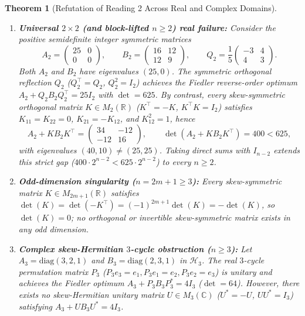 \documentclass[11pt,a4paper]{article}
\theoremstyle{plain}
\newtheorem{theorem}{Theorem}[section]
\theoremstyle{definition}
\newcommand{\C}{\mathbb{C}}
\newcommand{\R}{\mathbb{R}}
\newcommand{\diag}{\mathrm{diag}}
\newcommand{\Herm}{\mathcal{H}}
\begin{document}
\begin{theorem}[Refutation of Reading 2 Across Real and Complex Domains]\label{thm:refute2}
\leavevmode
\begin{enumerate}
  \item \textbf{Universal $2 \times 2$ (and block-lifted $n \ge 2$) real failure:} Consider the positive semidefinite integer symmetric matrices
  \[
    A_2 = \begin{pmatrix} 25 & 0 \\ 0 & 0 \end{pmatrix}, \qquad
    B_2 = \begin{pmatrix} 16 & 12 \\ 12 & 9 \end{pmatrix}, \qquad
    Q_2 = \frac{1}{5}\begin{pmatrix} -3 & 4 \\ 4 & 3 \end{pmatrix}.
  \]
  Both $A_2$ and $B_2$ have eigenvalues $(25, 0)$. The \emph{symmetric} orthogonal reflection $Q_2$ ($Q_2^\top = Q_2$, $Q_2^2 = I_2$) achieves the Fiedler reverse-order optimum $A_2 + Q_2 B_2 Q_2^\top = 25 I_2$ with $\det = 625$. By contrast, \emph{every} skew-symmetric orthogonal matrix $K \in M_2(\R)$ ($K^\top = -K$, $K^\top K = I_2$) satisfies $K_{11} = K_{22} = 0$, $K_{21} = -K_{12}$, and $K_{12}^2 = 1$, hence
  \[
    A_2 + K B_2 K^\top = \begin{pmatrix} 34 & -12 \\ -12 & 16 \end{pmatrix},
    \qquad
    \det(A_2 + K B_2 K^\top) = 400 < 625,
  \]
  with eigenvalues $(40, 10) \ne (25, 25)$. Taking direct sums with $I_{n-2}$ extends this strict gap ($400 \cdot 2^{n-2} < 625 \cdot 2^{n-2}$) to every $n \ge 2$.
  \item \textbf{Odd-dimension singularity ($n = 2m + 1 \ge 3$):} Every skew-symmetric matrix $K \in M_{2m+1}(\R)$ satisfies $\det(K) = \det(-K^\top) = (-1)^{2m+1}\det(K) = -\det(K)$, so $\det(K) = 0$; no orthogonal or invertible skew-symmetric matrix exists in any odd dimension.
  \item \textbf{Complex skew-Hermitian $3$-cycle obstruction ($n \ge 3$):} Let $A_3 = \diag(3, 2, 1)$ and $B_3 = \diag(2, 3, 1)$ in $\Herm_3$. The real $3$-cycle permutation matrix $P_3$ ($P_3 e_3 = e_1, P_3 e_1 = e_2, P_3 e_2 = e_3$) is unitary and achieves the Fiedler optimum $A_3 + P_3 B_3 P_3^* = 4 I_3$ ($\det = 64$). However, there exists \emph{no} skew-Hermitian unitary matrix $U \in M_3(\C)$ ($U^* = -U$, $U U^* = I_3$) satisfying $A_3 + U B_3 U^* = 4 I_3$.
\end{enumerate}
\end{theorem}
\end{document}
